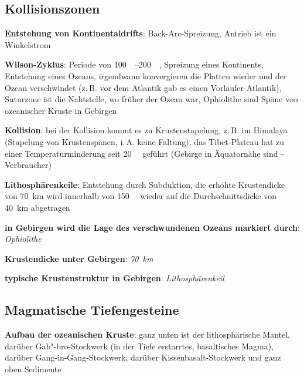 \pagebreak

\subsection{%
    Kollisionszonen%
}

\textbf{Entstehung von Kontinentaldrifts}:
Back-Arc-Spreizung,
Antrieb ist ein Winkelstrom

\textbf{Wilson-Zyklus}:
Periode von \SIrange{100}{200}{\mega\year},
Spreizung eines Kontinents,
Entstehung eines Ozeans,
irgendwann konvergieren die Platten wieder und der Ozean verschwindet
(z.\,B. vor dem Atlantik gab es einen Vorläufer-Atlantik),
Suturzone ist die Nahtstelle, wo früher der Ozean war,
Ophiolithe sind Späne von ozeanischer Kruste in Gebirgen

\textbf{Kollision}:
bei der Kollision kommt es zu Krustenstapelung, z.\,B. im Himalaya
(Stapelung von Krustenspänen, i.\,A. keine Faltung),
das Tibet-Plateau hat zu einer Temperaturminderung seit \SI{20}{\mega\year} geführt
(Gebirge in Äquatornähe sind -Verbraucher)

\textbf{Lithosphärenkeile}:
Entstehung durch Subduktion,
die erhöhte Krustendicke von \SI{70}{\kilo\meter} wird innerhalb von
\SI{150}{\mega\year} wieder auf die Durchschnittsdicke von \SI{40}{\kilo\meter} abgetragen

\begin{wichtig}
    \item
    \textbf{in Gebirgen wird die Lage des verschwundenen Ozeans markiert durch}:\\
    \emph{Ophiolithe}

    \item
    \textbf{Krustendicke unter Gebirgen}:
    \emph{\SI[math-rm=\mathit,text-rm=\itshape]{70}{\kilo\meter}}

    \item
    \textbf{typische Krustenstruktur in Gebirgen}:
    \emph{Lithosphärenkeil}
\end{wichtig}

\subsection{%
    Magmatische Tiefengesteine%
}

\textbf{Aufbau der ozeanischen Kruste}:
ganz unten ist der lithosphärische Mantel,
darüber Gab"-bro-Stockwerk (in der Tiefe erstarrtes, basaltisches Magma),
darüber Gang-in-Gang-Stockwerk,
darüber Kissenbasalt-Stockwerk und
ganz oben Sedimente

